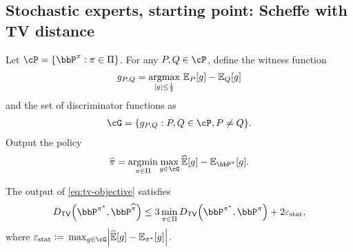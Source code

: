 \subsection{Stochastic experts, starting point: Scheffe with TV distance}
Let $\cP = \{\bbP^\pi : \pi \in \Pi\}$. For any $P,Q \in \cP$, define the witness function 
\begin{align*}
  g_{P,Q} = \mathop{\mathrm{argmax}}_{|g| \le \frac{1}{2}}{} \operatorname{\mathbb{E}}_P[g] - \operatorname{\mathbb{E}}_Q[g]   
\end{align*}
and the set of discriminator functions as 
\begin{align*}
  \cG = \cbr*{g_{P,Q} : P,Q \in \cP, P \neq Q}.  
\end{align*}
Output the policy 
\begin{align}
  \label{eq:tv-objective}
  \pihat = \argmin_{\pi\in\Pi}\max_{g\in\cG}{} \wh\En\sbr{g} - \En_{\bbP^\pi}\sbr{g}.  
\end{align}

\begin{proposition}
  \label{prop:tv-misspecified}
  The output of \cref{eq:tv-objective} satisfies  
  \begin{align*}
    \Dtv{\bbP^{\pistar}}{\bbP^{\pihat}} 
    \le 
    3\min_{\pi\in\Pi}\Dtv{\bbP^{\pistar}}{\bbP^\pi}
    + 2\vepsstat, 
  \end{align*}
  where $\vepsstat \ldef{} \max_{g \in \cG} \abr*{\wh\En\sbr{g} - \En_{\pistar}\sbr{g}}$. 
\end{proposition}


